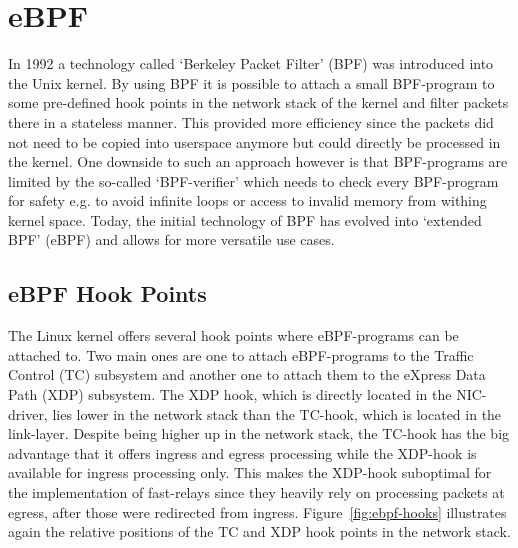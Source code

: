 \section{eBPF}\label{sec:ebpf_bg}
In 1992 a technology called `Berkeley Packet Filter' (BPF) was introduced into 
the Unix kernel.
By using BPF it is possible to attach a small BPF-program to some pre-defined hook points in 
the network stack of the kernel and filter packets there in a stateless manner.
This provided more efficiency since the packets did not need to be copied into 
userspace anymore but could directly be processed in the kernel.
One downside to such an approach however is that BPF-programs are limited by the 
so-called `BPF-verifier' which needs to check every BPF-program for safety e.g. 
to avoid infinite loops or access to invalid memory from withing kernel space. 
Today, the initial technology of BPF has evolved into `extended BPF' (eBPF) and 
allows for more versatile use cases.

\subsection{eBPF Hook Points}
The Linux kernel offers several hook points where eBPF-programs can be attached to.
Two main ones are one to attach eBPF-programs to the Traffic Control (TC) subsystem
and another one to attach them to the eXpress Data Path (XDP) subsystem.
The XDP hook, which is directly located in the NIC-driver, lies lower in the network 
stack than the TC-hook, which is located in the link-layer.
Despite being higher up in the network stack, the TC-hook has the big advantage that
it offers ingress and egress processing while the XDP-hook is available for ingress 
processing only.
This makes the XDP-hook suboptimal for the implementation of fast-relays since 
they heavily rely on processing packets at egress, after those were redirected
from ingress.
Figure~\autoref{fig:ebpf-hooks} illustrates again the relative positions of the TC and
XDP hook points in the network stack.

